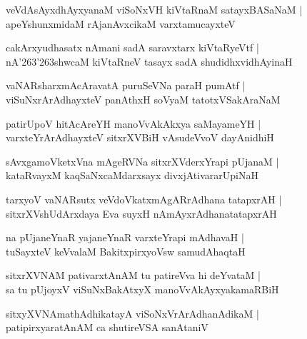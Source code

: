 \documentclass[twoside,12pt,openright]{book}
\def\S{\char'263}
\newcounter{shloka}[chapter]
\begin{document}
\begin{shloka}%
veVdAsAyxdhAyxyanaM viSoNxVH kiVtaRnaM satayxBASaNaM |\\
apeYshunxmidaM rAjanAvxcikaM varxtamucayxteV
\end{shloka}

\begin{shloka}%
cakArxyudhasatx nAmani sadA saravxtarx kiVtaRyeVtf |\\
nA\S \S shwcaM kiVtaRneV tasayx sadA shudidhxvidhAyinaH 
\end{shloka}

\begin{shloka}%
vaNARsharxmAcAravatA puruSeVNa paraH pumAtf |\\
viSuNxrArAdhayxteV panAthxH soVyaM tatotxVSakAraNaM 
\end{shloka}

\begin{shloka}%
patirUpoV hitAcAreYH manoVvAkAkxya saMayameYH |\\
varxteYrArAdhayxteV sitxrXVBiH vAsudeVvoV dayAnidhiH 
\end{shloka}

\begin{shloka}%
sAvxgamoVketxVna mAgeRVNa sitxrXVderxYrapi pUjanaM |\\
kataRvayxM kaqSaNxcaMdarxsayx divxjAtivararUpiNaH
\end{shloka}

\begin{shloka}%
tarxyoV vaNARsutx veVdoVkatxmAgARrAdhana tatapxrAH |\\
sitxrXVshUdArxdaya Eva suyxH nAmAyxrAdhanatatapxrAH 
\end{shloka}

\begin{shloka}%
na pUjaneYnaR yajaneYnaR varxteYrapi mAdhavaH |\\
tuSayxteV keVvalaM BakitxpirxyoVsw samudAhaqtaH 
\end{shloka}

\begin{shloka}%
sitxrXVNAM pativarxtAnAM tu patireVva hi deYvataM |\\
sa tu pUjoyxV viSuNxBakAtxyX manoVvAkAyxyakamaRBiH 
\end{shloka}

\begin{shloka}%
sitxyXVNAmathAdhikatayA viSoNxVrArAdhanAdikaM |\\
patipirxyaratAnAM ca shutireVSA sanAtaniV 
\end{shloka}
\end{document}
